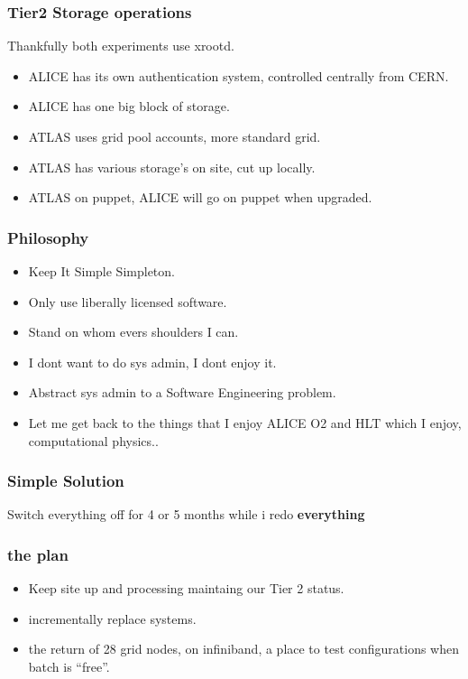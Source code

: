 \documentclass{beamer}
\begin{document}
\begin{frame}
  \frametitle{Tier2 Storage operations}
  Thankfully both experiments use xrootd.
  \begin{itemize}
    \item ALICE has its own authentication system, controlled centrally from CERN.
    \item ALICE has one big block of storage.
    \item ATLAS uses grid pool accounts, more standard grid.
    \item ATLAS has various storage's on site, cut up locally.
    \item ATLAS on puppet, ALICE will go on puppet when upgraded.
  \end{itemize}
\end{frame}

\begin{frame}
  \frametitle{Philosophy}
  \begin{itemize}
    \item Keep It Simple Simpleton.
    \item Only use liberally licensed software.
    \item Stand on whom evers shoulders I can.
    \item I dont want to do sys admin, I dont enjoy it.
    \item Abstract sys admin to a Software Engineering problem.
    \item Let me get back to the things that I enjoy ALICE O2 and HLT which I enjoy, computational physics..
  \end{itemize}
\end{frame}

\begin{frame}
  \frametitle{Simple Solution}
  Switch everything off for 4 or 5 months while i redo \bf{everything}
\end{frame}

\begin{frame}
  \frametitle{the plan}
  \begin{itemize}
    \item Keep site up and processing maintaing our Tier 2 status.
    \item incrementally replace systems.
    \item the return of 28 grid nodes, on infiniband, a place to test configurations when batch is ``free''.
  \end{itemize}
\end{frame}
\end{document}
